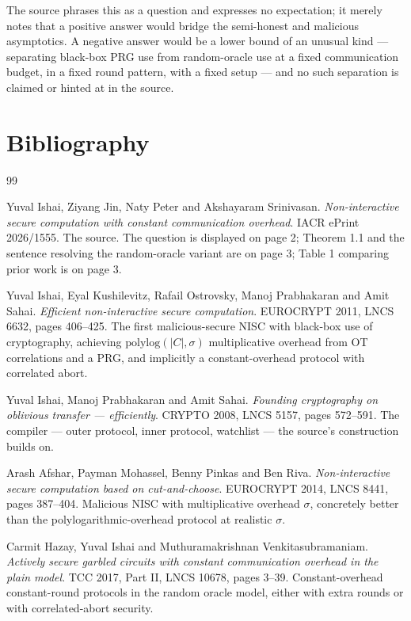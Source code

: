 \documentclass{aicr-conjecture}
\begin{document}
\begin{remark}
The source phrases this as a question and expresses no expectation; it
merely notes that a positive answer would bridge the semi-honest and
malicious asymptotics. A negative answer would be a lower bound of an
unusual kind --- separating black-box PRG use from random-oracle use at a
fixed communication budget, in a fixed round pattern, with a fixed setup
--- and no such separation is claimed or hinted at in the source.
\end{remark}

\section{Bibliography}

\begin{aicrbibliography}{99}

Yuval Ishai, Ziyang Jin, Naty Peter and Akshayaram Srinivasan.
\emph{Non-interactive secure computation with constant communication
overhead}.
IACR ePrint 2026/1555.
The source. The question is displayed on page 2; Theorem 1.1 and the
sentence resolving the random-oracle variant are on page 3; Table 1
comparing prior work is on page 3.

Yuval Ishai, Eyal Kushilevitz, Rafail Ostrovsky, Manoj Prabhakaran and
Amit Sahai.
\emph{Efficient non-interactive secure computation}.
EUROCRYPT 2011, LNCS 6632, pages 406--425.
The first malicious-secure NISC with black-box use of cryptography,
achieving $\mathrm{polylog}(|C|,\sigma)$ multiplicative overhead from OT
correlations and a PRG, and implicitly a constant-overhead protocol with
correlated abort.

Yuval Ishai, Manoj Prabhakaran and Amit Sahai.
\emph{Founding cryptography on oblivious transfer --- efficiently}.
CRYPTO 2008, LNCS 5157, pages 572--591.
The compiler --- outer protocol, inner protocol, watchlist --- the
source's construction builds on.

Arash Afshar, Payman Mohassel, Benny Pinkas and Ben Riva.
\emph{Non-interactive secure computation based on cut-and-choose}.
EUROCRYPT 2014, LNCS 8441, pages 387--404.
Malicious NISC with multiplicative overhead $\sigma$, concretely better
than the polylogarithmic-overhead protocol at realistic $\sigma$.

Carmit Hazay, Yuval Ishai and Muthuramakrishnan Venkitasubramaniam.
\emph{Actively secure garbled circuits with constant communication
overhead in the plain model}.
TCC 2017, Part II, LNCS 10678, pages 3--39.
Constant-overhead constant-round protocols in the random oracle model,
either with extra rounds or with correlated-abort security.


\end{aicrbibliography}
\end{document}

